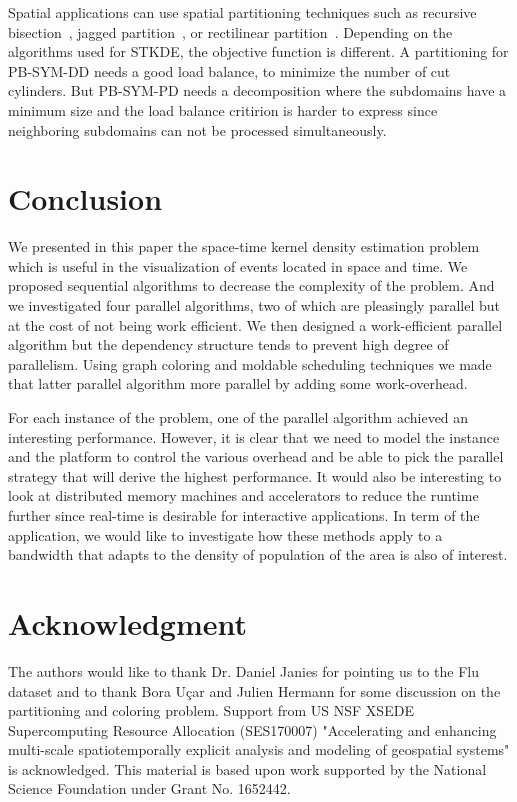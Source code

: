 \documentclass{article}
\begin{document}
Spatial applications can use spatial partitioning techniques 
such as recursive bisection~\cite{berger87}, jagged partition~\cite{ujaldon96,pinar97,DeveciRDC16}, or
rectilinear partition~\cite{nicol94,manne96}. Depending on the algorithms used for
STKDE, the objective function is different. A partitioning for
PB-SYM-DD needs a good load balance, to minimize the number of cut
cylinders. But PB-SYM-PD
needs a decomposition where the subdomains have a minimum size and the load balance critirion is harder to express since
neighboring subdomains can not be processed simultaneously.

\section{Conclusion}

We presented in this paper the space-time kernel density estimation
problem which is useful in the visualization of events located in
space and time. We proposed sequential algorithms to decrease the
complexity of the problem. And we investigated four parallel
algorithms, two of which are pleasingly parallel but at the cost of
not being work efficient. We then designed a work-efficient parallel
algorithm but the dependency structure tends to prevent high degree of
parallelism. Using graph coloring and moldable scheduling techniques
we made that latter parallel algorithm more parallel by adding some
work-overhead.

For each instance of the problem, one of the parallel algorithm
achieved an interesting performance. However, it is clear that we need
to model the instance and the platform to control the various overhead
and be able to pick the parallel strategy that will derive the highest
performance. It would also be interesting to look at distributed
memory machines and accelerators to reduce the runtime further since
real-time is desirable for interactive applications. In term of the
application, we would like to investigate how these methods apply to a
bandwidth that adapts to the density of population of the area is also
of interest.

\section*{Acknowledgment}

The authors would like to thank Dr. Daniel Janies for pointing us to
the Flu dataset and to thank Bora U\c{c}ar and Julien Hermann for some
discussion on the partitioning and coloring problem.
%
Support from US NSF XSEDE Supercomputing Resource Allocation
(SES170007) "Accelerating and enhancing multi-scale spatiotemporally
explicit analysis and modeling of geospatial systems" is acknowledged.
%
This material is based upon work supported by the National Science Foundation under Grant No. 1652442.
%




\end{document}
